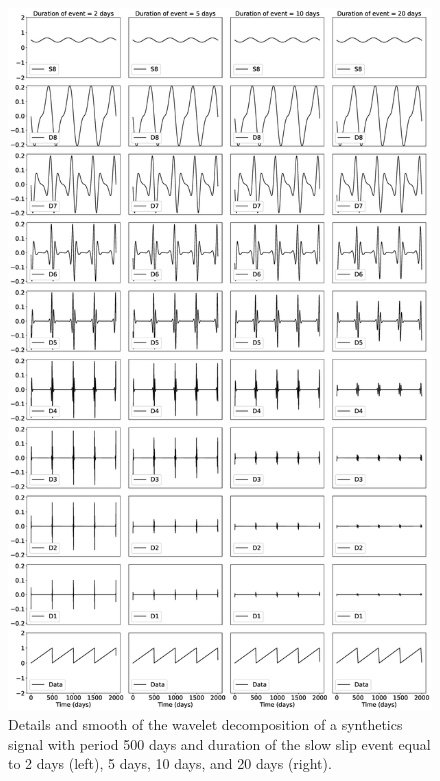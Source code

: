 \documentclass[draft]{agujournal2018}
\begin{document}
\begin{figure}
\noindent\includegraphics[width=\textwidth, trim={0cm 0cm 0cm 0cm},clip]{figures/500_DS.eps}
\caption{Details and smooth of the wavelet decomposition of a synthetics signal with period 500 days and duration of the slow slip event equal to 2 days (left), 5 days, 10 days, and 20 days (right).}
\label{pngfiguresample}
\end{figure}
\end{document}
